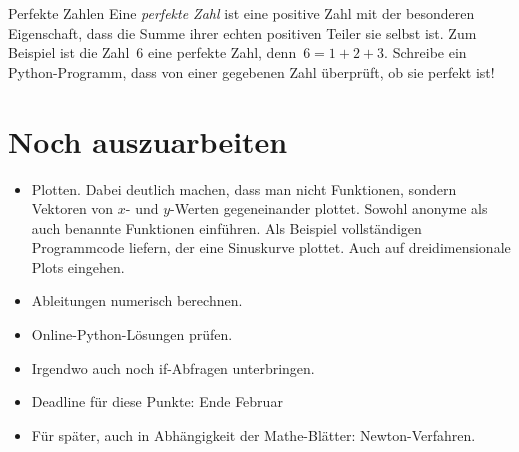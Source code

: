 \documentclass{blatt}
\begin{document}
\begin{aufgabe}{Perfekte Zahlen}
Eine \emph{perfekte Zahl} ist eine positive Zahl mit der besonderen
Eigenschaft, dass die Summe ihrer echten positiven Teiler sie selbst ist. Zum
Beispiel ist die Zahl~$6$ eine perfekte Zahl, denn~$6 = 1 + 2 + 3$.
Schreibe ein Python-Programm, dass von einer gegebenen Zahl überprüft, ob sie
perfekt ist!
\end{aufgabe}


\section{Noch auszuarbeiten}

\begin{itemize}
\item Plotten. Dabei deutlich machen, dass man nicht Funktionen, sondern
Vektoren von $x$- und $y$-Werten gegeneinander plottet. Sowohl anonyme als auch
benannte Funktionen einführen. Als Beispiel vollständigen Programmcode liefern,
der eine Sinuskurve plottet. Auch auf dreidimensionale Plots eingehen.
\item Ableitungen numerisch berechnen.
\item Online-Python-Lösungen prüfen.
\item Irgendwo auch noch if-Abfragen unterbringen.
\item Deadline für diese Punkte: Ende Februar
\item Für später, auch in Abhängigkeit der Mathe-Blätter: Newton-Verfahren.
\end{itemize}
\end{document}
